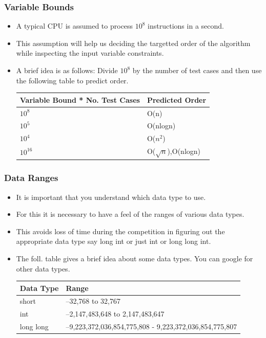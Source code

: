 \documentclass{beamer}
\begin{document}

\begin{frame}
\frametitle{Variable Bounds}
\begin{itemize}
\item A typical CPU is assumed to process $10^8$ instructions in a second.
\item This assumption will help us deciding the targetted order of the algorithm while inspecting the input variable constraints.
\item A brief idea is as follows:
Divide $10^8$ by the number of test cases and then use the following table to predict order.

\begin{table}
\begin{tabular}{l l}
\toprule
\textbf{Variable Bound * No. Test Cases} & \textbf{Predicted Order}\\
\midrule
$10^8$ & O(n)\\
$10^5$ & O(nlogn)\\
$10^4$ & O($n^2$)\\
$10^{16}$ & O($\sqrt{n}$),O(nlogn)\\
\bottomrule
\end{tabular}
\end{table}


\end{itemize}
\end{frame}

\begin{frame}
\frametitle{Data Ranges}
\begin{itemize}
\item It is important that you understand which data type to use.
\item For this it is necessary to have a feel of the ranges of various data types.
\item This avoids loss of time during the competition in figuring out the appropriate data type say long int or just int or long long int.

\item The foll. table gives a brief idea about some data types. You can google for other data types.

\begin{table}
\begin{tabular}{l l}
\toprule
\textbf{Data Type} & \textbf{Range}\\
\midrule
short & –32,768 to 32,767\\
int &  –2,147,483,648 to 2,147,483,647\\
long long  & –9,223,372,036,854,775,808 - 9,223,372,036,854,775,807\\
\bottomrule
\end{tabular}
\end{table}
\end{itemize}
\end{frame}
\end{document}
